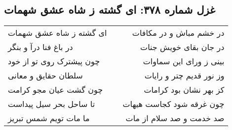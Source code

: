 \begin{center}
\section*{غزل شماره ۳۷۸: ای گشته ز شاه عشق شهمات}
\label{sec:0378}
\begin{longtable}{l p{0.5cm} r}
ای گشته ز شاه عشق شهمات
&&
در خشم مباش و در مکافات
\\
در باغ فنا درآ و بنگر
&&
در جان بقای خویش جنات
\\
چون پیشترک روی تو از خود
&&
بینی ز ورای این سماوات
\\
سلطان حقایق و معانی
&&
وز نور قدیم چتر و رایات
\\
چون گشت عیان مجو کرامت
&&
کز بهر نشان بود کرامات
\\
تا ساحل بحر سیل پیداست
&&
چون غرقه شود کجاست هیهات
\\
ما مات تویم شمس تبریز
&&
صد خدمت و صد سلام از مات
\\
\end{longtable}
\end{center}
